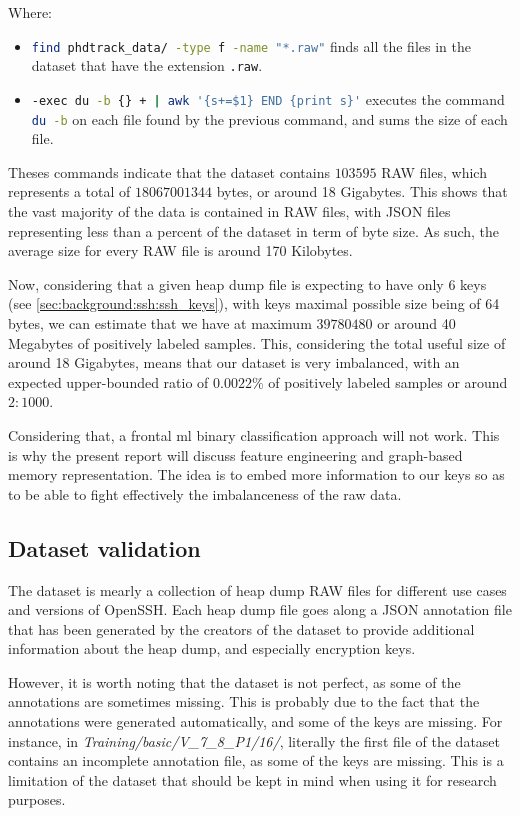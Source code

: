     Where:
    \begin{itemize}
        \item \lstinline[language=bash]!find phdtrack_data/ -type f -name "*.raw"! finds all the files in the dataset that have the extension \lstinline[language=bash]!.raw!.
        \item \lstinline[language=bash]!-exec du -b {} + | awk '{s+=$1} END {print s}'! executes the command \lstinline[language=bash]!du -b! on each file found by the previous command, and sums the size of each file.
    \end{itemize}

    Theses commands indicate that the dataset contains $ 103595 $ RAW files, which represents a total of $ 18067001344 $ bytes, or around 18 Gigabytes. This shows that the vast majority of the data is contained in RAW files, with JSON files representing less than a percent of the dataset in term of byte size. As such, the average size for every RAW file is around 170 Kilobytes. 

    Now, considering that a given heap dump file is expecting to have only 6 keys (see \ref{sec:background:ssh:ssh_keys}), with keys maximal possible size being of 64 bytes, we can estimate that we have at maximum $ 39780480 $ or around 40 Megabytes of positively labeled samples. This, considering the total useful size of around 18 Gigabytes, means that our dataset is very imbalanced, with an expected upper-bounded ratio of $ 0.0022\% $ of positively labeled samples or around $ 2:1000 $.

    Considering that, a frontal \acrshort{ml} binary classification approach will not work. This is why the present report will discuss feature engineering and graph-based memory representation. The idea is to embed more information to our keys so as to be able to fight effectively the imbalanceness of the raw data.

    \subsection{Dataset validation}
    The dataset is mearly a collection of heap dump RAW files for different use cases and versions of OpenSSH. Each heap dump file goes along a JSON annotation file that has been generated by the creators of the dataset to provide additional information about the heap dump, and especially encryption keys.
    
    However, it is worth noting that the dataset is not perfect, as some of the annotations are sometimes missing. This is probably due to the fact that the annotations were generated automatically, and some of the keys are missing. For instance, in \textit{Training/basic/V\_7\_8\_P1/16/}, literally the first file of the dataset contains an incomplete annotation file, as some of the keys are missing. This is a limitation of the dataset that should be kept in mind when using it for research purposes.

